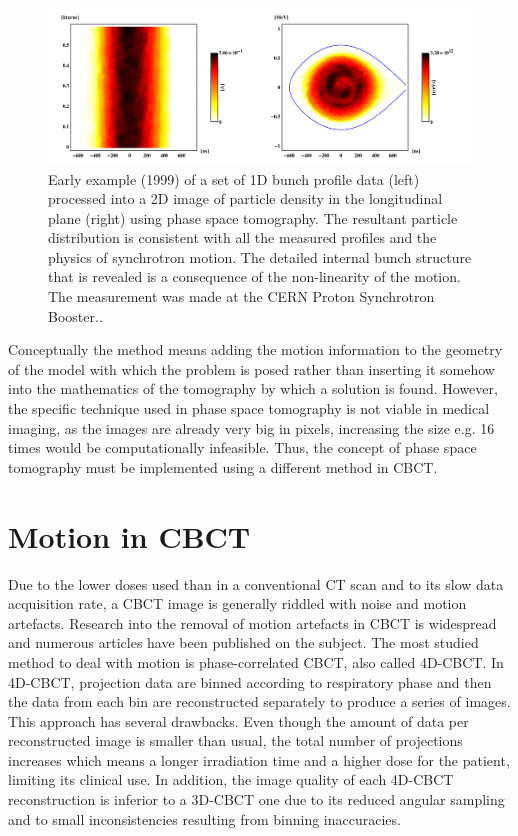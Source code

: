 \begin{figure}

\begin{center} 

\includegraphics[width=\linewidth]{StateOfArt/Tosca2016fig.png} 

\caption[Phase space tomography]{\label{fig:PST} Early example (1999) of a set of 1D bunch profile data (left) processed into a 2D image of particle density in the longitudinal plane (right) using phase space tomography.  The resultant particle distribution is consistent with all the measured profiles and the physics of synchrotron motion.  The detailed internal bunch structure that is revealed is a consequence of the non-linearity of the motion.  The measurement was made at the CERN Proton Synchrotron Booster.\cite{pstweb}.} 
\end{center} 
\end{figure}


 Conceptually the method means adding the motion information to the geometry of the model with which the problem is posed rather than inserting it somehow into the mathematics of the tomography by which a solution is found. However, the specific technique used in phase space tomography is not viable in medical imaging, as the images are already very big in pixels, increasing the size e.g. 16 times would be computationally infeasible. Thus, the concept of phase space tomography must be implemented using a different method in CBCT.

\section{Motion in CBCT}
Due to the lower doses used than in a conventional CT scan and to its slow data acquisition rate, a CBCT image is generally riddled with noise and motion artefacts.  Research into the removal of motion artefacts in CBCT is widespread and numerous articles have been published on the subject.  The most studied method to deal with motion is phase-correlated CBCT, also called 4D-CBCT\cite{sonke2005respiratory}\cite{thomas2006}\cite{li2006four}\cite{Pengpan2012246}\cite{t2016first}.  In 4D-CBCT, projection data are binned according to respiratory phase and then the data from each bin are reconstructed separately to produce a series of images.  This approach has several drawbacks.  Even though the amount of data per reconstructed image is smaller than usual, the total number of projections increases which means a longer irradiation time and a higher dose for the patient, limiting its clinical use.  In addition, the image quality of each 4D-CBCT reconstruction is inferior to a 3D-CBCT one due to its reduced angular sampling and to small inconsistencies resulting from binning inaccuracies. 

